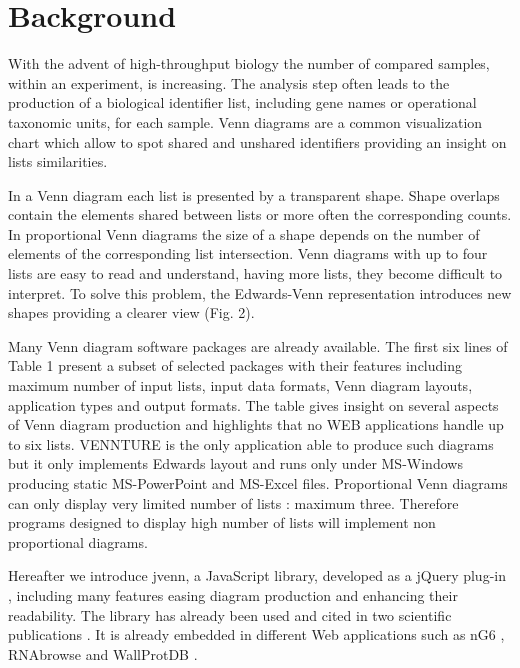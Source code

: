 \documentclass{bmcart}
\begin{document}


\section*{Background}

With the advent of high-throughput biology the number of compared samples,
within an experiment, is increasing. The analysis step often leads to the
production of a biological identifier list, including gene names or operational
taxonomic units, for each sample. Venn diagrams \cite{Venn1880} are a common
visualization chart which allow to spot shared and unshared identifiers
providing an insight on lists similarities. 

In a Venn diagram each list is presented by a transparent shape. Shape overlaps
contain the elements shared between lists or more often the corresponding counts.
In proportional Venn diagrams the size of a shape depends on the number of
elements of the corresponding list intersection. Venn diagrams with up to four 
lists are easy to read and understand, having more lists, they become difficult
to interpret. To solve this problem, the Edwards-Venn \cite{Edwards2004}
representation introduces new shapes providing a clearer view (Fig. 2). 

Many Venn diagram software packages are already available. The first six lines
of Table 1 present a subset of selected packages with their features including 
maximum number of input lists, input data formats, Venn diagram layouts,
application types and output formats. The table gives insight on several aspects
of Venn diagram production and highlights that no WEB applications handle up to
six lists. VENNTURE \cite{Bronwen2012} is the only application able to
produce such diagrams but it only implements Edwards layout and runs only
under MS-Windows producing static MS-PowerPoint and MS-Excel files. Proportional
Venn diagrams can only display very limited number of lists : maximum three.
Therefore programs designed to display high number of lists will implement non
proportional diagrams. 

Hereafter we introduce jvenn, a JavaScript library, developed as a jQuery
plug-in \cite{jquery}, including many features easing diagram production and
enhancing their readability. The library has already been used and cited in two
scientific publications \cite{Bianchia2013, Aravindraja2013}. It is already
embedded in different Web applications such as nG6 \cite{Mariette2012},
RNAbrowse \cite{Mariette} and WallProtDB \cite{SanClemente}.
\end{document}

